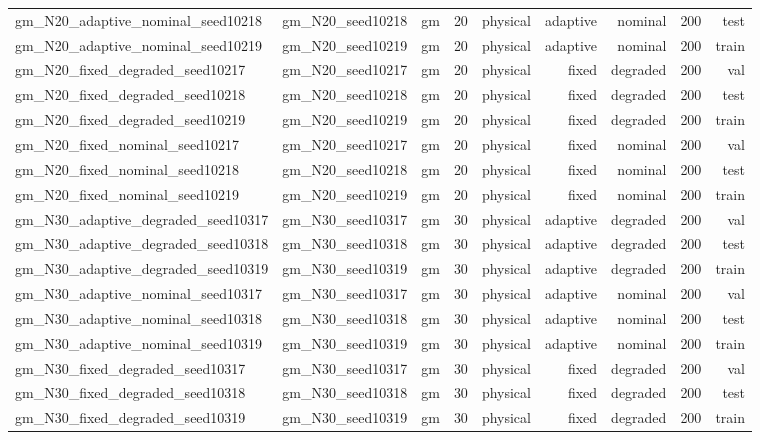 \begin{tabular}{lrrrrrrrr}
gm\_N20\_adaptive\_nominal\_seed10218 & gm\_N20\_seed10218 & gm & 20 & physical & adaptive & nominal & 200 & test \\
gm\_N20\_adaptive\_nominal\_seed10219 & gm\_N20\_seed10219 & gm & 20 & physical & adaptive & nominal & 200 & train \\
gm\_N20\_fixed\_degraded\_seed10217 & gm\_N20\_seed10217 & gm & 20 & physical & fixed & degraded & 200 & val \\
gm\_N20\_fixed\_degraded\_seed10218 & gm\_N20\_seed10218 & gm & 20 & physical & fixed & degraded & 200 & test \\
gm\_N20\_fixed\_degraded\_seed10219 & gm\_N20\_seed10219 & gm & 20 & physical & fixed & degraded & 200 & train \\
gm\_N20\_fixed\_nominal\_seed10217 & gm\_N20\_seed10217 & gm & 20 & physical & fixed & nominal & 200 & val \\
gm\_N20\_fixed\_nominal\_seed10218 & gm\_N20\_seed10218 & gm & 20 & physical & fixed & nominal & 200 & test \\
gm\_N20\_fixed\_nominal\_seed10219 & gm\_N20\_seed10219 & gm & 20 & physical & fixed & nominal & 200 & train \\
gm\_N30\_adaptive\_degraded\_seed10317 & gm\_N30\_seed10317 & gm & 30 & physical & adaptive & degraded & 200 & val \\
gm\_N30\_adaptive\_degraded\_seed10318 & gm\_N30\_seed10318 & gm & 30 & physical & adaptive & degraded & 200 & test \\
gm\_N30\_adaptive\_degraded\_seed10319 & gm\_N30\_seed10319 & gm & 30 & physical & adaptive & degraded & 200 & train \\
gm\_N30\_adaptive\_nominal\_seed10317 & gm\_N30\_seed10317 & gm & 30 & physical & adaptive & nominal & 200 & val \\
gm\_N30\_adaptive\_nominal\_seed10318 & gm\_N30\_seed10318 & gm & 30 & physical & adaptive & nominal & 200 & test \\
gm\_N30\_adaptive\_nominal\_seed10319 & gm\_N30\_seed10319 & gm & 30 & physical & adaptive & nominal & 200 & train \\
gm\_N30\_fixed\_degraded\_seed10317 & gm\_N30\_seed10317 & gm & 30 & physical & fixed & degraded & 200 & val \\
gm\_N30\_fixed\_degraded\_seed10318 & gm\_N30\_seed10318 & gm & 30 & physical & fixed & degraded & 200 & test \\
gm\_N30\_fixed\_degraded\_seed10319 & gm\_N30\_seed10319 & gm & 30 & physical & fixed & degraded & 200 & train \\

\end{tabular}
